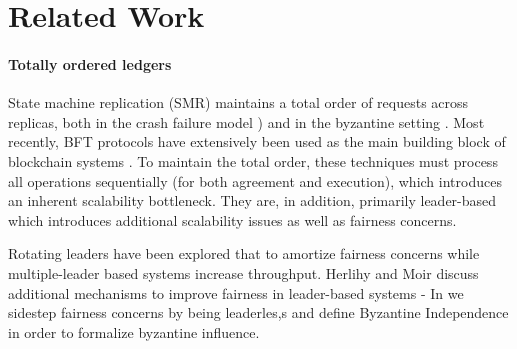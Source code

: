 
\section{Related Work}  
\paragraph{Totally ordered ledgers}
State machine replication (SMR) \cite{schneider1990implementing} maintains a total order of requests across replicas, both in the crash failure model  \cite{Li2007, Lampson2001, Lamport98Paxos, Lamport2005a, Lamport2005, Lamport01Paxos, Chandra2007}  \cite{junqueira2011zab, van2014vive, oki1988viewstampeda, liskov2012viewstamped, ongaro2014search}) and in the byzantine setting \cite{castro1999practical, martin2006fast, kotla2007zyzzyva,  gueta2018sbft, clement2009making, buchman2016tendermint, yin2019hotstuff, Clement09Upright, duan2014hbft    , pires2018generalized, bessani2014state, lamport2011byzantizing, arun2019ezbft, malkhi2019flexible, duan2014hbft, yin2003separating, Guerraoui08Next, Kotla04High,  liskov2010viewstamped}. Most recently, BFT protocols have extensively been used as the main building block of blockchain systems \cite{Hyperledger, EthereumQuorum, buchman2016tendermint, al2017chainspace, kokoris2018omniledger,  gilad2017algorand, baudet2019state}. To maintain the total order, these techniques must process  all operations sequentially (for both agreement and execution), which introduces an inherent scalability bottleneck. They are, in addition, primarily leader-based which introduces additional scalability issues \cite{moraru2013there, zhang2015tapir, stathakopoulou2019mir} as well as fairness concerns. 

Rotating leaders \cite{clement2009making, buchman2016tendermint, yin2019hotstuff} have been explored that to amortize fairness concerns while multiple-leader based systems \cite{moraru2013there, stathakopoulou2019mir, arun2019ezbft, li2016sarek} increase throughput. Herlihy and Moir \cite{herlihy2016enhancing} discuss additional mechanisms to improve fairness in leader-based systems - In \sys we sidestep fairness concerns by being leaderles,s and define Byzantine Independence in order to formalize byzantine influence.

